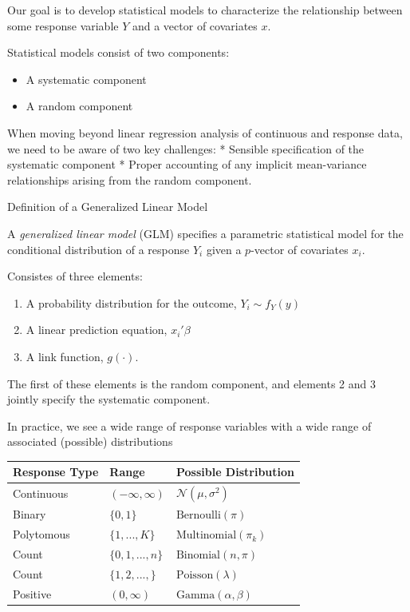 \documentclass[
  letterpaper,
  DIV=11,
  numbers=noendperiod]{scrreport}
\providecommand{\tightlist}{%
  \setlength{\itemsep}{0pt}\setlength{\parskip}{0pt}}\usepackage{longtable,booktabs,array}
\begin{document}
Our goal is to develop statistical models to characterize the
relationship between some response variable \(Y\) and a vector of
covariates \(x\).

Statistical models consist of two components:

\begin{itemize}
\tightlist
\item
  A systematic component
\item
  A random component
\end{itemize}

When moving beyond linear regression analysis of continuous and response
data, we need to be aware of two key challenges: * Sensible
specification of the systematic component * Proper accounting of any
implicit mean-variance relationships arising from the random component.

{Definition of a Generalized Linear Model}

A \emph{generalized linear model} (GLM) specifies a parametric
statistical model for the conditional distribution of a response \(Y_i\)
given a \(p\)-vector of covariates \(x_i\).

Consistes of three elements:

\begin{enumerate}
\def\labelenumi{\arabic{enumi}.}
\tightlist
\item
  A probability distribution for the outcome, \(Y_i \sim f_{Y}(y)\)
\item
  A linear prediction equation, \(x_i' \beta\)
\item
  A link function, \(g(\cdot)\).
\end{enumerate}

The first of these elements is the random component, and elements 2 and
3 jointly specify the systematic component.

In practice, we see a wide range of response variables with a wide range
of associated (possible) distributions

\begin{longtable}[]{@{}lll@{}}
\toprule()
Response Type & Range & Possible Distribution \\
\midrule()
\endhead
Continuous & \((-\infty, \infty)\) & \(\mathcal N(\mu, \sigma^2)\) \\
Binary & \(\{0, 1\}\) & \(\text{Bernoulli}(\pi)\) \\
Polytomous & \(\{1, ..., K \}\) & \(\text{Multinomial}(\pi_k)\) \\
Count & \(\{0, 1, ..., n \}\) & \(\text{Binomial}(n, \pi)\) \\
Count & \(\{1, 2, ..., \}\) & \(\text{Poisson}(\lambda)\) \\
Positive & \((0, \infty)\) & \(\text{Gamma}(\alpha, \beta)\) \\
\bottomrule()
\end{longtable}
\end{document}
